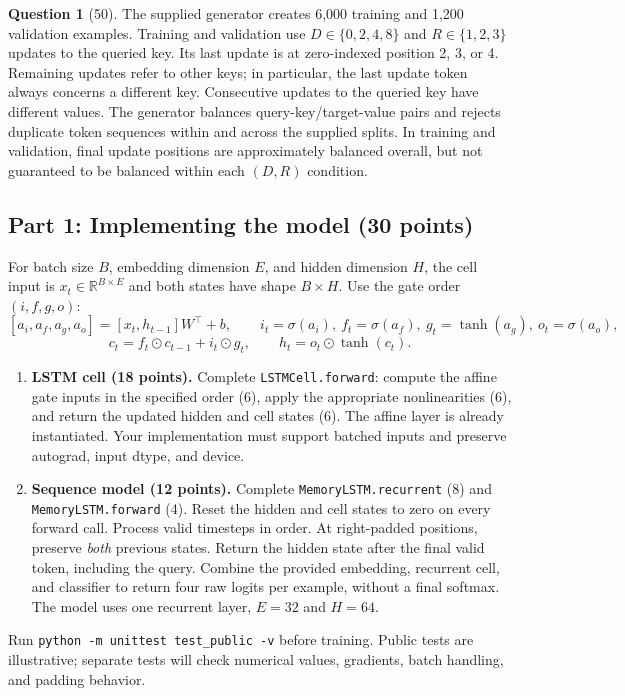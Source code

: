 \documentclass[12pt]{article}
\theoremstyle{definition}
\newtheorem{exercise}{Question}%
\begin{document}
\begin{exercise}[50]
{The supplied generator creates 6,000 training and 1,200 validation examples.
Training and validation use $D\in\{0,2,4,8\}$ and
$R\in\{1,2,3\}$ updates to the queried key. Its last update is at
zero-indexed position 2, 3, or 4. Remaining updates refer to other keys;
in particular, the last update token always concerns a different key.
Consecutive updates to the queried key have different values.
The generator balances query-key/target-value pairs and rejects duplicate
token sequences within and across the supplied splits. In training and validation, final update positions are approximately balanced overall, but not guaranteed to be balanced within each $(D,R)$ condition.

\subsection*{Part 1: Implementing the model (30 points)}
For batch size $B$, embedding dimension $E$, and hidden dimension $H$,
the cell input is $x_t\in\mathbb{R}^{B\times E}$ and both states have
shape $B\times H$. Use the gate order $(i,f,g,o)$:
\[
 [a_i,a_f,a_g,a_o]=[x_t,h_{t-1}]W^\top+b,
 \qquad i_t=\sigma(a_i),\ f_t=\sigma(a_f),\ g_t=\tanh(a_g),\ o_t=\sigma(a_o),
\]
\[
 c_t=f_t\odot c_{t-1}+i_t\odot g_t,
 \qquad h_t=o_t\odot\tanh(c_t).
\]
\begin{enumerate}
\item \textbf{LSTM cell (18 points).} Complete \texttt{LSTMCell.forward}:
compute the affine gate inputs in the specified order (6), apply the
appropriate nonlinearities (6), and return the updated hidden and cell states
(6). The affine layer is already instantiated. Your implementation must
support batched inputs and preserve autograd, input dtype, and device.

\item \textbf{Sequence model (12 points).} Complete
\texttt{MemoryLSTM.recurrent} (8) and \texttt{MemoryLSTM.forward} (4).
Reset the hidden and cell states to zero on every forward call.
Process valid timesteps in order. At right-padded positions, preserve
\emph{both} previous states. Return the hidden state after the final valid
token, including the query. Combine the provided embedding, recurrent cell,
and classifier to return four raw logits per example, without a final
softmax. The model uses one recurrent layer, $E=32$ and $H=64$.
\end{enumerate}

Run \texttt{python -m unittest test\_public -v} before training.
Public tests are illustrative; separate tests will check numerical values,
gradients, batch handling, and padding behavior.

}
\end{exercise}
\end{document}
